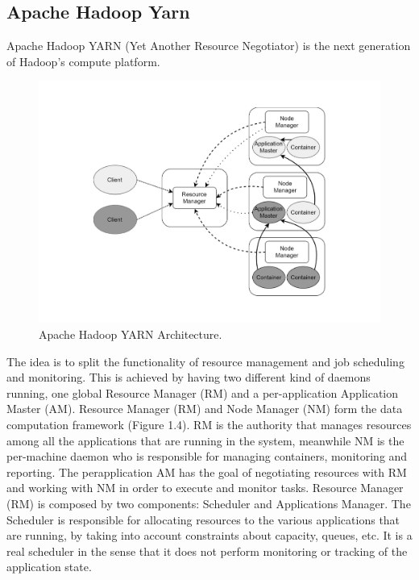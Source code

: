 \subsection{Apache Hadoop Yarn}\label{sec:hadoop_yarn}
Apache Hadoop YARN (Yet Another Resource Negotiator) is the next
generation of Hadoop’s compute platform\cite{Vavilapalli:2013:AHY:2523616.2523633}. 
\begin{figure}
	\centering
	\includegraphics[width=\columnwidth]{Images/apache_hadoop_yarn_architecture.pdf}  
	\caption[Apache Hadoop YARN Architecture]{Apache Hadoop YARN Architecture.}
	\label{fig:apacheHadoopYarnArchitecture}
\end{figure}
The idea is to split
the functionality of resource management and job scheduling and
monitoring. This is achieved by having two different kind of daemons
running, one global Resource Manager (RM) and a per-application
Application Master (AM).
Resource Manager (RM) and Node Manager (NM) form the data
computation framework (Figure 1.4). RM is the authority that manages
resources among all the applications that are running in the
system, meanwhile NM is the per-machine daemon who is responsible
for managing containers, monitoring and reporting. The perapplication
AM has the goal of negotiating resources with RM and
working with NM in order to execute and monitor tasks.
Resource Manager (RM) is composed by two components: Scheduler
and Applications Manager.
The Scheduler is responsible for allocating resources to the various
applications that are running, by taking into account constraints
about capacity, queues, etc. It is a real scheduler in the sense that
it does not perform monitoring or tracking of the application state.
